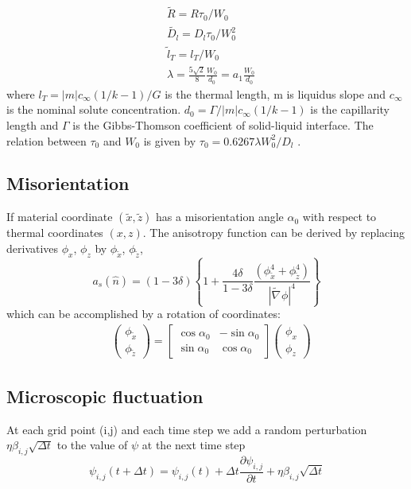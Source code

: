 \documentclass[a4paper,12pt]{article}
\newcommand{\grad}[1]{\nabla_{#1}}
\newcommand{\T}[1]{\tilde{#1}}
\newcommand{\WT}[1]{\widetilde{#1}}
\begin{document}
\begin{align}
    & \tilde{R} = R\tau_0 / W_0 \\
    & \tilde{D_l} = D_l \tau_0 / W_0^2 \\
    & \tilde{l}_T = l_T / W_0 \\
    & \lambda =  \frac{5\sqrt{2}}{8}  \frac{W_0}{d_0} = a_{1} \frac{W_0}{d_0}
\end{align}
 where $ l_T = {|m|c_{\infty}(1/k-1)}/{G}$ is the thermal length, m is liquidus slope and $c_{\infty}$ is the nominal solute concentration. $d_0 = {\Gamma}/{|m|c_{\infty}(1/k-1)}$  is the capillarity length and $\Gamma$ is the Gibbs-Thomson coefficient of solid-liquid interface. The relation between $\tau_0$ and $W_0$ is given by $\tau_0 =  {0.6267\lambda W_0^2}/{D_l} $ \cite{Echebarria2004}.

\subsection{Misorientation}
If material coordinate $(\T{x},\T{z})$ has a misorientation angle $\alpha_0$ with respect to thermal coordinates $(x,z)$. The anisotropy function can be derived by replacing derivatives $\phi_{{x}}$, $\phi_{{z}}$ by $\phi_{\T{x}}$, $\phi_{\T{z}}$, 
\begin{equation}
a_{s}(\hat{n}) = (1-3\delta)\left\{1+\frac{4 \delta}{1-3\delta}  \frac{(\phi_{\T{x}}^4 + \phi_{\T{z}}^4 )}{| \WT{\grad{}} \phi|^4}  \right\} 
\end{equation}
which can be accomplished by a rotation of coordinates:
\begin{align}
& \left( 
\begin{array}{c}
\phi_{\T{x}} \\ 
\phi_{\T{z}}
\end{array}
\right)
=
\left[
\begin{array}{cc}
\cos \alpha_{0} & -\sin \alpha_{0} \\
\sin \alpha_{0} & \cos \alpha_{0}
\end{array}
\right]
\left( 
\begin{array}{c}
\phi_{x} \\ 
\phi_{z}
\end{array}
\right) 
\end{align}

\subsection{Microscopic fluctuation}
At each grid point (i,j) and each time step we add a random perturbation $\eta\beta_{i,j}\sqrt{\Delta t}$ to the value of $\psi$ at the next time step \cite{Tourret2015}
\begin{equation}
\psi_{i, j}(t+\Delta t)=\psi_{i, j}(t)+\Delta t \frac{\partial \psi_{i, j}}{\partial t}+\eta \beta_{i, j} \sqrt{\Delta t}
\end{equation}
\end{document}
